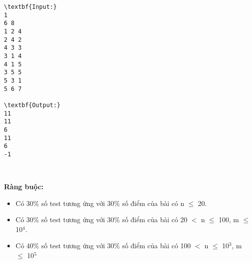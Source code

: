 \begin{verbatim}
\textbf{Input:}
1
6 8
1 2 4
2 4 2
4 3 3
3 1 4
4 1 5
3 5 5
5 3 1
5 6 7

\textbf{Output:}
11
11
6
11
6
-1\end{verbatim}

 

\textbf{Ràng buộc:}
\begin{itemize}
	\item Có 30\% số test tương ứng với 30\% số điểm của bài có n  $\le$  20.
	\item Có 30\% số test tương ứng với 30\% số điểm của bài có 20 $<$ n  $\le$  100, m  $\le$  10$^4$.
	\item Có 40\% số test tương ứng với 30\% số điểm của bài có 100 $<$ n  $\le$  10$^3$, m  $\le$  10$^5$
\end{itemize}
\begin{itemize}
\end{itemize}